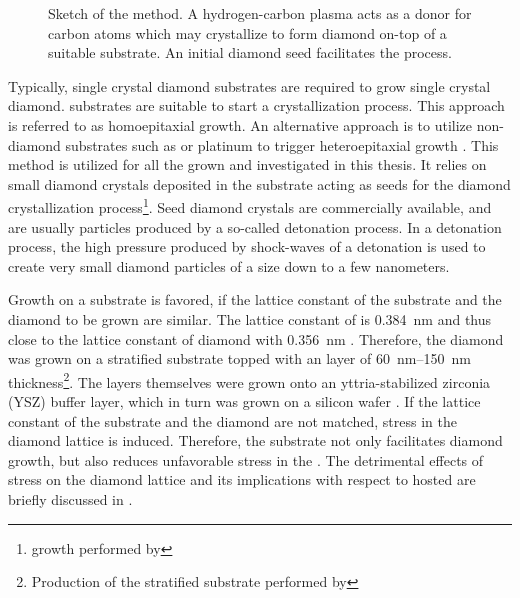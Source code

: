 	\begin{figure}[htp]
		\centering
		\caption[\CVD production method]{Sketch of the \CVD method. A hydrogen-carbon plasma acts as a donor for carbon atoms which may crystallize to form diamond on-top of a suitable \ir substrate. An initial diamond seed facilitates the process.}
		\label{fig::cvd_sketch}
	\end{figure}

	Typically, single crystal diamond substrates are required to grow single crystal diamond. \HPHT substrates are suitable to start a crystallization process. This approach is referred to as homoepitaxial growth. An alternative approach is to utilize non-diamond substrates such as \ir or platinum to trigger heteroepitaxial growth \cite{tachibana2001growth, lin1994local}.
	This method is utilized for all the \CVD \nds grown and investigated in this thesis.
	It relies on small diamond crystals deposited in the substrate acting as seeds for the diamond crystallization process\footnote{\CVD \nd growth performed by \gsell}. Seed diamond crystals are commercially available, and are usually particles produced by a so-called detonation process.
	In a detonation process, the high pressure produced by shock-waves of a detonation is used to create very small diamond particles of a size down to a few nanometers.
	
	Growth on a substrate is favored, if the lattice constant of the substrate and the diamond to be grown are similar.
	The lattice constant of \ir is \SI{0.384}{nm} \cite{Arblaster2010,Gsell2007} and thus close to the lattice constant of diamond with \SI{0.356}{nm} \cite{davis1993diamond}.
	Therefore, the diamond was grown on a stratified substrate topped with an \ir layer of \SIrange{60}{150}{nm} thickness\footnote{Production of the stratified substrate performed by \gsell}.
	The \ir layers themselves were grown onto an yttria-stabilized zirconia (YSZ) buffer layer, which in turn was grown on a silicon wafer \cite{Gsell2004a}.
	If the lattice constant of the substrate and the diamond are not matched, stress in the diamond lattice is induced.
	Therefore, the \ir substrate not only facilitates diamond growth, but also reduces unfavorable stress in the \nds. The detrimental effects of stress on the diamond lattice and its implications with respect to hosted \sivs are briefly discussed in .

